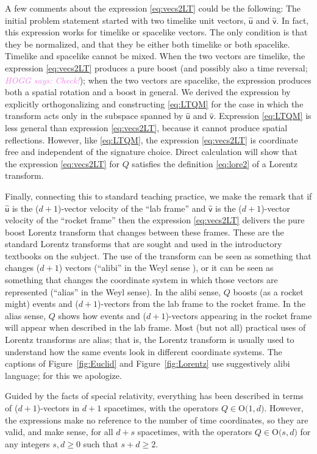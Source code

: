 \documentclass{article}
\newcommand{\Lhat}[1]{\hat{\mathsf{#1}}} %
\newcommand{\plus}{\!+\!} %
\newcommand{\figref}[1]{Figure~\ref{#1}}
\newcommand{\HOGG}[1]{\textcolor{violet}{\textsl{HOGG says: {#1}}}}
\begin{document}
A few comments about the expression \eqref{eq:vecs2LT} could be the following:
The initial problem statement started with two timelike unit vectors, $\Lhat{u}$ and $\Lhat{v}$.
In fact, this expression works for timelike or spacelike vectors.
The only condition is that they be normalized, and that they be either both timelike or both spacelike.
Timelike and spacelike cannot be mixed.
When the two vectors are timelike, the expression \eqref{eq:vecs2LT} produces a pure boost (and possibly also a time reversal; \HOGG{Check!});
when the two vectors are spacelike, the expression produces both a spatial rotation and a boost in general.
We derived the expression by explicitly orthogonalizing and constructing \eqref{eq:LTQM} for the case in which the transform acts only in the subspace spanned by $\Lhat{u}$ and $\Lhat{v}$.
Expression \eqref{eq:LTQM} is less general than expression \eqref{eq:vecs2LT}, because it cannot produce spatial reflections.
However, like \eqref{eq:LTQM}, the expression \eqref{eq:vecs2LT} is coordinate free and independent of the signature choice.
Direct calculation will show that the expression \eqref{eq:vecs2LT} for $Q$ satisfies the definition \eqref{eq:lore2} of a Lorentz transform.

Finally, connecting this to standard teaching practice, we make the remark that if $\Lhat{u}$ is the ($d\plus1$)-vector velocity of the ``lab frame'' and $\Lhat{v}$ is the ($d\plus1$)-vector velocity of the ``rocket frame'' then the expression \eqref{eq:vecs2LT} delivers the pure boost Lorentz transform that changes between these frames.
These are the standard Lorentz transforms that are sought and used in the introductory textbooks on the subject.
The use of the transform can be seen as something that changes ($d\plus1$) vectors (``alibi'' in the Weyl sense \cite{weyl}),
or it can be seen as something that changes the coordinate system in which those vectors are represented (``alias'' in the Weyl sense).
In the alibi sense, $Q$ boosts (as a rocket might) events and ($d\plus1$)-vectors from the lab frame to the rocket frame.
In the alias sense, $Q$ shows how events and ($d\plus1$)-vectors appearing in the rocket frame will appear when described in the lab frame.
Most (but not all) practical uses of Lorentz transforms are alias;
that is, the Lorentz transform is usually used to understand how the same events look in different coordinate systems.
The captions of \figref{fig:Euclid} and \figref{fig:Lorentz} use suggestively alibi language; for this we apologize.

Guided by the facts of special relativity, everything has been described in terms of ($d\plus1$)-vectors in $d\plus1$ spacetimes, with the operators $Q\in\mbox{O($1,d$)}$.
However, the expressions make no reference to the number of time coordinates, so they are valid, and make sense, for all $d\plus s$ spacetimes, with the operators $Q\in\mbox{O($s,d$)}$ for any integers $s,d\geq 0$ such that $s+d\geq 2$.
\end{document}
